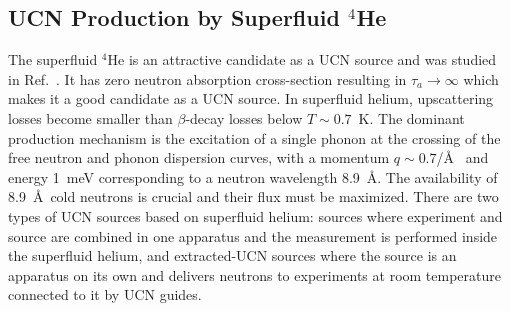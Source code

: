 \subsection{UCN Production by Superfluid $^4$He}
The superfluid $^4$He is an attractive candidate as a UCN source and
was studied in Ref.~\cite{Golub77}.
It has zero neutron absorption cross-section resulting in $\tau_a
\rightarrow \infty$ which makes it a good candidate as a UCN source.
In superfluid helium, upscattering losses become smaller than
$\beta$-decay losses below $T \sim 0.7$~K.  The dominant production
mechanism is the excitation of a single phonon at the crossing of the
free neutron and phonon dispersion curves, with a momentum $q\sim
0.7$/\AA~\cite{Brome2001} and energy 1~meV corresponding to a
neutron wavelength 8.9~\AA. The availability of 8.9~\AA~cold neutrons
is crucial and their flux must be maximized.
There are two types of UCN sources based on superfluid helium: sources
where experiment and source are combined in one apparatus and the
measurement is performed inside the superfluid helium, and
extracted-UCN sources where the source is an apparatus on its own and
delivers neutrons to experiments at room temperature connected to it
by UCN guides.



